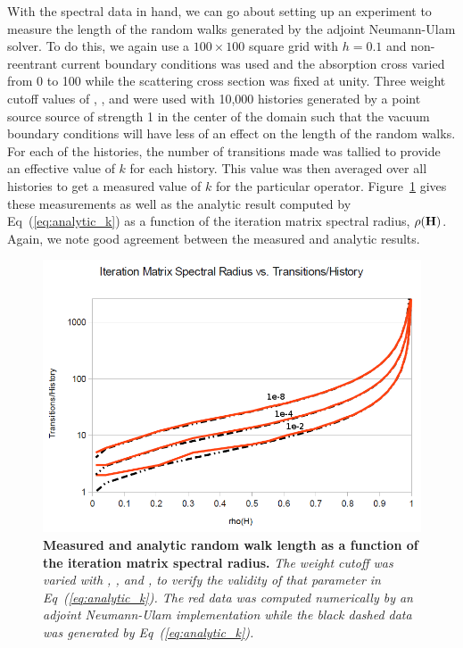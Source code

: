 \documentclass{mc2013}
\begin{document}
With the spectral data in hand, we can go about setting up an
experiment to measure the length of the random walks generated by the
adjoint Neumann-Ulam solver. To do this, we again use a $100 \times
100$ square grid with $h=0.1$ and non-reentrant current boundary
conditions was used and the absorption cross varied from 0 to 100
while the scattering cross section was fixed at unity. Three weight
cutoff values of , , and  were used with
10,000 histories generated by a point source source of strength 1 in
the center of the domain such that the vacuum boundary conditions will
have less of an effect on the length of the random walks. For each of
the histories, the number of transitions made was tallied to provide
an effective value of $k$ for each history. This value was then
averaged over all histories to get a measured value of $k$ for the
particular operator. Figure~\ref{fig:measured_length} gives these
measurements as well as the analytic result computed by
Eq~(\ref{eq:analytic_k}) as a function of the iteration matrix
spectral radius, $\rho(\mathbf{H})$. Again, we note good agreement between
the measured and analytic results.
\begin{figure}[ht!]
  \begin{spacing}{1.0}
    \begin{center}
      \includegraphics[width=5in,clip]{measured_length.png}
    \end{center}
    \caption{\textbf{Measured and analytic random walk length as a
        function of the iteration matrix spectral radius.} \textit{The
        weight cutoff was varied with , , and
        , to verify the validity of that parameter in
        Eq~(\ref{eq:analytic_k}). The red data was computed numerically
        by an adjoint Neumann-Ulam implementation while the black dashed
        data was generated by Eq~(\ref{eq:analytic_k}).}}
    \label{fig:measured_length}
  \end{spacing}
\end{figure}
\end{document}
